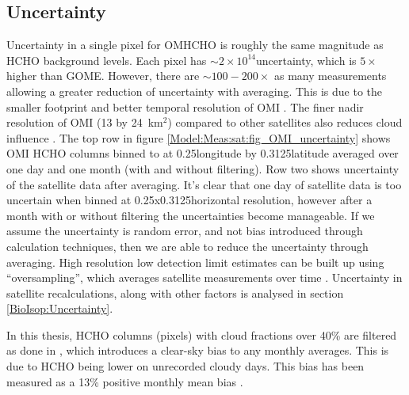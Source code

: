   \subsection{Uncertainty}
    Uncertainty in a single pixel for OMHCHO is roughly the same magnitude as HCHO background levels.
    Each pixel has $\sim 2 \times 10^{14}$\moleccm uncertainty, which is $5 \times$ higher than GOME.
    However, there are $\sim 100-200 \times $ as many measurements allowing a greater reduction of uncertainty with averaging.
    This is due to the smaller footprint and better temporal resolution of OMI \parencite{Chance2002,Millet2008}.
    The finer nadir resolution of OMI (13 by 24~km${^2}$) compared to other satellites also reduces cloud influence \parencite{Millet2006, Millet2008}.
    The top row in figure \ref{Model:Meas:sat:fig_OMI_uncertainty} shows OMI HCHO columns binned to at 0.25\degr longitude by 0.3125\degr latitude averaged over one day and one month (with and without filtering).
    Row two shows uncertainty of the satellite data after averaging.
    It's clear that one day of satellite data is too uncertain when binned at 0.25x0.3125\degr horizontal resolution, however after a month with or without filtering the uncertainties become manageable.
    If we assume the uncertainty is random error, and not bias introduced through calculation techniques, then we are able to reduce the uncertainty through averaging.
    High resolution low detection limit estimates can be built up using ``oversampling'', which averages satellite measurements over time \parencite[eg.][]{Zhu2014}.
    Uncertainty in satellite recalculations, along with other factors is analysed in section \ref{BioIsop:Uncertainty}.
    
    In this thesis, HCHO columns (pixels) with cloud fractions over 40\% are filtered as done in \textcite{Palmer2001}, which introduces a clear-sky bias to any monthly averages.
    This is due to HCHO being lower on unrecorded cloudy days.
    This bias has been measured as a 13\% positive monthly mean bias \parencite{Palmer2001, Surl2018}.
    
    
